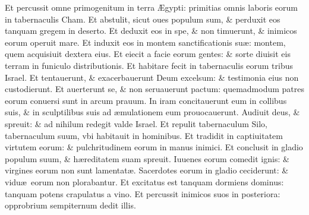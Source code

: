 \documentclass[a5paper,10pt]{book}
\def\ae{æ}
\def\AE{Æ}
\begin{document}
\begin{multicols*}{2}
\newline \color{red} E\color{black}t percussit omne primogenitum in terra \AE gypti: primitias omnis laboris eorum in tabernaculis Cham.
\newline \color{red} E\color{black}t abstulit, sicut oues populum sum, \& perduxit eos tanquam gregem in deserto.%
\newline \color{red} E\color{black}t deduxit eos in spe, \& non timuerunt, \& inimicos eorum operuit mare.
\newline \color{red} E\color{black}t induxit eos in montem sanctificationis su\ae : montem, quem acquisiuit dextera eius.
\newline \color{red} E\color{black}t eiecit a facie eorum gentes: \& sorte diuisit eis terram in funiculo distributionis.
\newline \color{red} E\color{black}t habitare fecit in tabernaculis eorum tribus Israel.
\newline \color{red} E\color{black}t tentauerunt, \& exacerbauerunt Deum excelsum: \& testimonia eius non custodierunt.
\newline \color{red} E\color{black}t auerterunt se, \& non seruauerunt pactum: quemadmodum patres eorum conuersi sunt in arcum prauum.
\newline \color{red} I\color{black}n iram concitauerunt eum in collibus suis, \& in sculptilibus suis ad \ae mulationem eum prouocauerunt.
\newline \color{red} A\color{black}udiuit deus, \& spreuit: \& ad nihilum redegit valde Israel.
\newline \color{red} E\color{black}t repulit tabernaculum Silo, tabernaculum suum, vbi habitauit in hominibus.
\newline \color{red} E\color{black}t tradidit in captiuitatem virtutem eorum: \& pulchritudinem eorum in manus inimici.
\newline \color{red} E\color{black}t conclusit in gladio populum suum, \& h\ae reditatem suam spreuit.
\newline \color{red} I\color{black}uuenes eorum comedit ignis: \& virgines eorum non sunt lamentat\ae .
\newline \color{red} S\color{black}acerdotes eorum in gladio ceciderunt: \& vidu\ae \ eorum non plorabantur.
\newline \color{red} E\color{black}t excitatus est tanquam dormiens dominus: tanquam potens crapulatus a vino.
\newline \color{red} E\color{black}t percussit inimicos suos in posteriora: opprobrium sempiternum dedit illis.

\end{multicols*}
\end{document}
